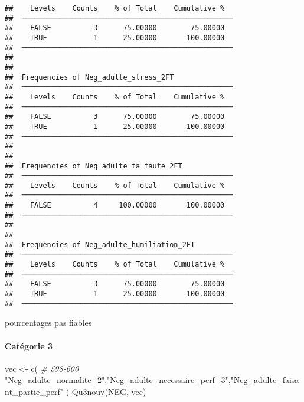 \documentclass[
]{article}
\newenvironment{Shaded}{\begin{snugshade}}{\end{snugshade}}
\newcommand{\CommentTok}[1]{\textcolor[rgb]{0.56,0.35,0.01}{\textit{#1}}}
\newcommand{\FunctionTok}[1]{\textcolor[rgb]{0.00,0.00,0.00}{#1}}
\newcommand{\NormalTok}[1]{#1}
\newcommand{\OtherTok}[1]{\textcolor[rgb]{0.56,0.35,0.01}{#1}}
\newcommand{\StringTok}[1]{\textcolor[rgb]{0.31,0.60,0.02}{#1}}
\begin{document}
\begin{verbatim}
##    Levels    Counts    % of Total    Cumulative %   
##  ────────────────────────────────────────────────── 
##    FALSE          3      75.00000        75.00000   
##    TRUE           1      25.00000       100.00000   
##  ────────────────────────────────────────────────── 
## 
## 
##  Frequencies of Neg_adulte_stress_2FT               
##  ────────────────────────────────────────────────── 
##    Levels    Counts    % of Total    Cumulative %   
##  ────────────────────────────────────────────────── 
##    FALSE          3      75.00000        75.00000   
##    TRUE           1      25.00000       100.00000   
##  ────────────────────────────────────────────────── 
## 
## 
##  Frequencies of Neg_adulte_ta_faute_2FT             
##  ────────────────────────────────────────────────── 
##    Levels    Counts    % of Total    Cumulative %   
##  ────────────────────────────────────────────────── 
##    FALSE          4     100.00000       100.00000   
##  ────────────────────────────────────────────────── 
## 
## 
##  Frequencies of Neg_adulte_humiliation_2FT          
##  ────────────────────────────────────────────────── 
##    Levels    Counts    % of Total    Cumulative %   
##  ────────────────────────────────────────────────── 
##    FALSE          3      75.00000        75.00000   
##    TRUE           1      25.00000       100.00000   
##  ──────────────────────────────────────────────────
\end{verbatim}

pourcentages pas fiables

\hypertarget{catuxe9gorie-3-5}{%
\paragraph{Catégorie 3}\label{catuxe9gorie-3-5}}

\begin{Shaded}
\begin{Highlighting}[]
\NormalTok{vec }\OtherTok{\textless{}{-}} \FunctionTok{c}\NormalTok{(   }\CommentTok{\# 598{-}600}
  \StringTok{"Neg\_adulte\_normalite\_2"}\NormalTok{,}\StringTok{"Neg\_adulte\_necessaire\_perf\_3"}\NormalTok{,}\StringTok{"Neg\_adulte\_faisant\_partie\_perf"}
\NormalTok{)}
\FunctionTok{Qu3nouv}\NormalTok{(NEG, vec)}
\end{Highlighting}
\end{Shaded}
\end{document}
